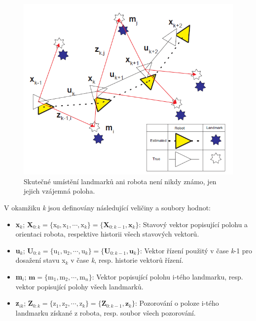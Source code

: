 \documentclass[12pt,a4paper]{article}
\begin{document}
\begin{figure}[H]
\centering
\includegraphics[scale=0.6]{Obr2}
\caption{Skutečné umístění landmarků ani robota není nikdy známo, jen jejich vzájemná poloha.}
\end{figure}

V okamžiku \textit{k} jsou definovány následující veličiny a soubory hodnot:
\begin{itemize}
\item \textbf{x}$_k$; \textbf{X}$_{0:k}=\lbrace \text{x}_0, \text{x}_1,\cdots, \text{x}_k\rbrace = \lbrace \textbf{X}_{0:k-1}, \textbf{x}_k \rbrace$:  
Stavový vektor popisující polohu a orientaci robota, respektive  historii všech stavových vektorů.
\item \textbf{u}$_k$; \textbf{U}$_{0:k}=\lbrace \text{u}_1, \text{u}_2,\cdots, \text{u}_k\rbrace = \lbrace \textbf{U}_{0:k-1}, \textbf{u}_k \rbrace$: 
Vektor řízení použitý v čase \textit{k}-1 pro dosažení stavu x$_k$ v čase \textit{k}, resp. historie vektorů řízení.
\item \textbf{m}$_i$; $\textbf{m}=\lbrace \text{m}_1, \text{m}_2,\cdots, \text{m}_n\rbrace$: 
Vektor popisující polohu i-tého landmarku, resp. vektor popisující polohy všech landmarků.
\item \textbf{z}$_{ik}$; \textbf{Z}$_{0:k}=\lbrace \text{z}_1, \text{z}_2,\cdots, \text{z}_k\rbrace = \lbrace \textbf{Z}_{0:k-1}, \textbf{z}_k \rbrace$: 
Pozorování o poloze i-tého landmarku získané z robota, resp. soubor všech pozorování.
\end{itemize}
\end{document}
